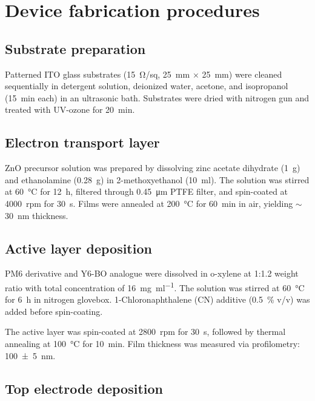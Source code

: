 \documentclass[11pt,a4paper]{article}
\begin{document}
\section{Device fabrication procedures}\label{si:fabrication}

\subsection{Substrate preparation}

Patterned ITO glass substrates (\SI{15}{\ohm/sq}, \SI{25}{mm} $\times$ \SI{25}{mm}) were cleaned sequentially in detergent solution, deionized water, acetone, and isopropanol (\SI{15}{min} each) in an ultrasonic bath. Substrates were dried with nitrogen gun and treated with UV-ozone for \SI{20}{min}.

\subsection{Electron transport layer}

ZnO precursor solution was prepared by dissolving zinc acetate dihydrate (\SI{1}{g}) and ethanolamine (\SI{0.28}{g}) in 2-methoxyethanol (\SI{10}{\milli\litre}). The solution was stirred at \SI{60}{\degreeCelsius} for \SI{12}{\hour}, filtered through \SI{0.45}{\micro\meter} PTFE filter, and spin-coated at \SI{4000}{rpm} for \SI{30}{\second}. Films were annealed at \SI{200}{\degreeCelsius} for \SI{60}{\minute} in air, yielding $\sim$\SI{30}{\nano\meter} thickness.

\subsection{Active layer deposition}

PM6 derivative and Y6-BO analogue were dissolved in o-xylene at 1:1.2 weight ratio with total concentration of \SI{16}{\milli\gram\per\milli\litre}. The solution was stirred at \SI{60}{\degreeCelsius} for \SI{6}{\hour} in nitrogen glovebox. 1-Chloronaphthalene (CN) additive (\SI{0.5}{\percent} v/v) was added before spin-coating.

The active layer was spin-coated at \SI{2800}{rpm} for \SI{30}{\second}, followed by thermal annealing at \SI{100}{\degreeCelsius} for \SI{10}{\minute}. Film thickness was measured via profilometry: \SI{100 \pm 5}{\nano\meter}.

\subsection{Top electrode deposition}
\end{document}
